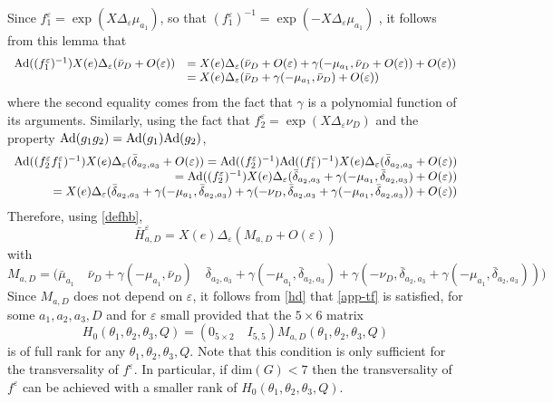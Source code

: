 \documentclass[a4paper,twoside]{article}
\def \Ad {\textnormal{Ad}}
\def \eps {\varepsilon}
\begin{document}
\noindent Since $f_1^\eps= \exp (X \Delta_\eps \mu_{a_1})$, so that $(f_1^\eps)^{-1}= \exp (-X \Delta_\eps \mu_{a_1})$ , 
it follows from this lemma that 
\[
\begin{array}{ll}
\Ad((f_1^\eps)^{-1}) X(e) \Delta_\eps (\bar \nu_{D}+O(\eps)) & = 
X(e) \Delta_\eps (\bar \nu_D+O(\eps)+ \gamma(-\mu_{a_1},\bar \nu_{D}+O(\eps))+O(\eps)) \\
 & = X(e) \Delta_\eps (\bar \nu_D + \gamma(-\mu_{a_1},\bar \nu_{D}) +O(\eps))
\end{array}
\]
where the second equality comes from the fact that $\gamma$ is  a polynomial function of its arguments.
Similarly, using the fact that $f_2^\eps= \exp (X \Delta_\eps \nu_{D})$ and the property $\Ad(g_1 g_2) = \Ad(g_1) \Ad(g_2)$,
\[
\begin{array}{r}
\Ad((f_2^\eps f_1^\eps)^{-1}) X(e)  \Delta_\eps (\bar \delta_{a_2,a_3}+O(\eps)) 
  = \Ad((f_2^\eps)^{-1}) \Ad(( f_1^\eps)^{-1}) X(e)  \Delta_\eps (\bar \delta_{a_2,a_3}+O(\eps)) \\
  = \Ad((f_2^\eps)^{-1}) X(e) \Delta_\eps (\bar \delta_{a_2,a_3} +\gamma(-\mu_{a_1},\bar \delta_{a_2,a_3}) +O(\eps)) \\
  = X(e) \Delta_\eps ( \bar \delta_{a_2,a_3} +\gamma(-\mu_{a_1},\bar \delta_{a_2,a_3}) 
+ \gamma(-\nu_D,\bar \delta_{a_2,a_3} + \gamma(-\mu_{a_1}, \bar \delta_{a_2,a_3})) + O(\eps))
\end{array}
\]
Therefore, using \eqref{defhb},
\begin{equation}
\label{hd}
\bar H_{a,D}^\eps=  X(e) \Delta_\eps (M_{a,D} +O(\eps))
\end{equation}
with
\[
M_{a,D} = \bigl( \bar \mu_{a_1} \quad \bar \nu_{D}+ \gamma(-\mu_{a_1},\bar \nu_{D}) \quad 
\bar \delta_{a_2,a_3} + \gamma(-\mu_{a_1},\bar \delta_{a_2,a_3}) +
\gamma(-\nu_D,\bar \delta_{a_2,a_3} + \gamma(-\mu_{a_1},\bar \delta_{a_2,a_3})) \bigr)
\]
Since $M_{a,D}$ does not depend on $\eps$, it follows from \eqref{hd} that \eqref{app-tf} is satisfied, 
for some $a_1,a_2,a_3,D$ and for $\eps$ small provided that the $5\times 6$ matrix
\[
H_0(\theta_1,\theta_2,\theta_3,Q)= (0_{5 \times 2} \quad I_{5,5} ) M_{a,D} (\theta_1,\theta_2,\theta_3,Q)
\]
is of full rank for any $\theta_1,\theta_2,\theta_3,Q$. Note that this condition is only sufficient for 
the transversality of $f^\eps$. In particular, if $\text{dim}(G) < 7$ then the transversality of $f^\eps$ can 
be achieved with a smaller rank of $H_0(\theta_1,\theta_2,\theta_3,Q)$.
\vspace*{.2cm}
\end{document}
